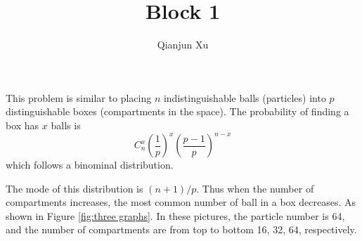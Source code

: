\documentclass{assignmeownt}
\title{Block 1}
\author{Qianjun Xu}
\date{}
\begin{document}
\maketitle
\thispagestyle{firststyle}

This problem is similar to placing $n$ indistinguishable balls (particles) into $p$ distinguishable boxes (compartments in the space). The probability of finding a box has $x$ balls is
$$C_n^x(\frac{1}{p})^{x}(\frac{p-1}{p})^{n-x}$$
which follows a binominal distribution. 

The mode of this distribution is $(n+1)/p$. Thus when the number of compartments increases, the most common number of ball in a box decreases. As shown in Figure \ref{fig:three graphs}. In these pictures, the particle number is 64, and the number of compartments are from top to bottom 16, 32, 64, respectively.
\end{document}
